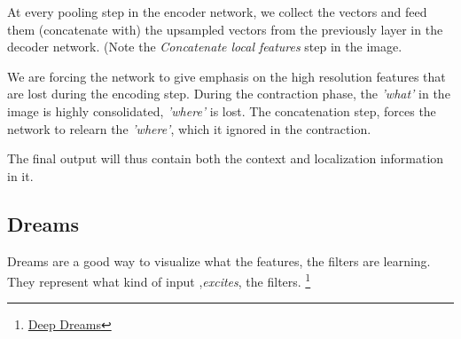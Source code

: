 \documentclass[12pt, a4paper]{article}
\begin{document}
At every pooling step in the encoder network, we collect the vectors and feed them (concatenate with) the upsampled vectors from the previously layer in the decoder network. (Note the \emph{Concatenate local features} step in the image.

We are forcing the network to give emphasis on the high resolution features that are lost during the encoding step. During the contraction phase, the \emph{'what'} in the image is highly consolidated, \emph{'where'} is lost. The concatenation step, forces the network to relearn the \emph{'where'}, which it ignored in the contraction.

The final output will thus contain both the context and localization information in it. 
\subsection{Dreams}
Dreams are a good way to visualize what the features, the filters are learning. They represent what kind of input ,\emph{excites}, the filters. 
\footnote{\href{https://blog.keras.io/category/demo.html}{Deep Dreams}}
\end{document}
